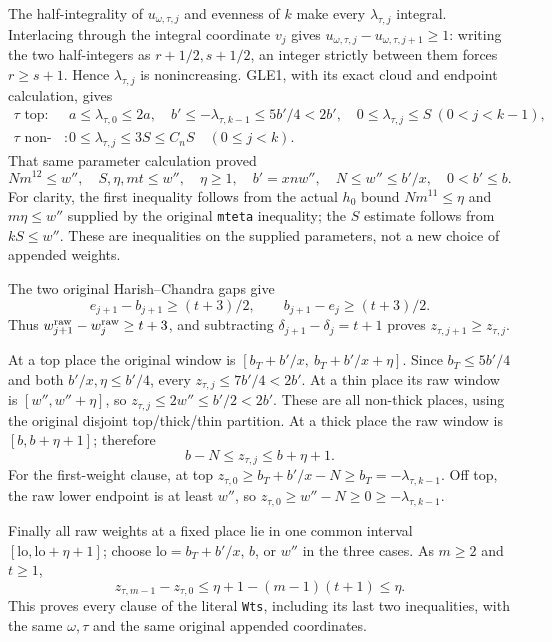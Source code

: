 The half-integrality of $u_{\omega,\tau,j}$ and evenness of $k$
make every $\lambda_{\tau,j}$ integral. Interlacing through the
integral coordinate $v_j$ gives
$u_{\omega,\tau,j}-u_{\omega,\tau,j+1}\ge1$:
writing the two half-integers as $r+1/2,s+1/2$, an integer
strictly between them forces $r\ge s+1$.
Hence $\lambda_{\tau,j}$ is nonincreasing.
GLE1, with its exact cloud and endpoint calculation, gives
\[
 \begin{array}{ll}
 \tau\text{ top}:&
 a\le\lambda_{\tau,0}\le2a,\quad
 b'\le-\lambda_{\tau,k-1}\le5b'/4<2b',\quad
 0\le\lambda_{\tau,j}\le S\ (0<j<k-1),\\
 \tau\text{ non-top}:&
 0\le\lambda_{\tau,j}\le3S\le C_nS\quad(0\le j<k).
 \end{array}                                                 \tag{GVC.14}
\]
That same parameter calculation proved
\[
 Nm^{12}\le w'',\quad S,\eta,mt\le w'',\quad
 \eta\ge1,\quad b'=xn w'',\quad
 N\le w''\le b'/x,\quad0<b'\le b.                            \tag{GVC.15}
\]
For clarity, the first inequality follows from the actual
$h_0$ bound $Nm^{11}\le\eta$ and
$m\eta\le w''$ supplied by the original \texttt{mteta}
inequality; the $S$ estimate follows from $kS\le w''$.
These are inequalities on the supplied parameters, not a new
choice of appended weights.

The two original Harish--Chandra gaps give
\[
 e_{j+1}-b_{j+1}\ge(t+3)/2,\qquad
 b_{j+1}-e_j\ge(t+3)/2.
\]
Thus $w_{j+1}^{\rm raw}-w_j^{\rm raw}\ge t+3$,
and subtracting $\delta_{j+1}-\delta_j=t+1$ proves
$z_{\tau,j+1}\ge z_{\tau,j}$.

At a top place the original window is
$[b_T+b'/x,\ b_T+b'/x+\eta]$.
Since $b_T\le5b'/4$ and both $b'/x,\eta\le b'/4$,
every $z_{\tau,j}\le7b'/4<2b'$.
At a thin place its raw window is $[w'',w''+\eta]$,
so $z_{\tau,j}\le2w''\le b'/2<2b'$.
These are all non-thick places, using the original disjoint
top/thick/thin partition.
At a thick place the raw window is $[b,b+\eta+1]$;
therefore
\[
                    b-N\le z_{\tau,j}\le b+\eta+1.
\]
For the first-weight clause, at top
$z_{\tau,0}\ge b_T+b'/x-N\ge b_T=-\lambda_{\tau,k-1}$.
Off top, the raw lower endpoint is at least $w''$,
so $z_{\tau,0}\ge w''-N\ge0\ge-\lambda_{\tau,k-1}$.

Finally all raw weights at a fixed place lie in one common
interval $[\mathrm{lo},\mathrm{lo}+\eta+1]$; choose
$\mathrm{lo}=b_T+b'/x$, $b$, or $w''$ in the three cases.
As $m\ge2$ and $t\ge1$,
\[
 z_{\tau,m-1}-z_{\tau,0}
 \le\eta+1-(m-1)(t+1)\le\eta.
\]
This proves every clause of the literal \texttt{Wts}, including
its last two inequalities, with the same $\omega,\tau$ and the
same original appended coordinates.

